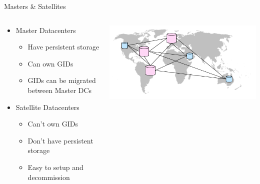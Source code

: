 \documentclass[aspectratio=169]{beamer}
\begin{document}
\begin{frame}{Masters \& Satellites}
    \begin{columns}
        \begin{column}[c]{0.6\textwidth}
            \begin{itemize}
                \item Master Datacenters
                    \begin{itemize}
                        \item Have persistent storage
                        \item Can own GIDs
                        \item GIDs can be migrated between Master DCs
                    \end{itemize}
                \item Satellite Datacenters
                    \begin{itemize}
                        \item Can't own GIDs
                        \item Don't have persistent storage
                        \item Easy to setup and decommission
                    \end{itemize}
            \end{itemize}
        \end{column}
        \begin{column}[c]{0.4\textwidth}
            \includegraphics[width=\textwidth]{images/worldmapdc.png}
        \end{column}
    \end{columns}
\end{frame}
\end{document}

